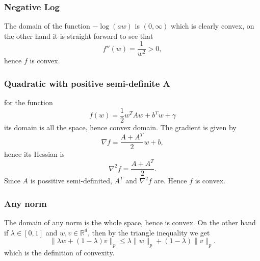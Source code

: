 \documentclass[11pt]{article}
\theoremstyle{plain}
\begin{document}
\subsubsection{Negative Log}
The domain of the function $-\log(aw)$ is $(0,\infty)$ which is clearly convex, on the 
other hand it is straight forward to see that 
\begin{equation*}
f''(w)=\frac{1}{w^{2}}>0,
\end{equation*}
hence $f$ is convex.

\subsubsection{Quadratic with positive semi-definite A}
for the function
\begin{equation*}
f(w)=\frac{1}{2}w^{T}Aw+b^{T}w+\gamma
\end{equation*}
its domain is all the space, hence convex domain. The gradient is given by
\begin{equation*}
\nabla f= \frac{A+A^{T}}{2}w+b,
\end{equation*}
hence its Hessian is
\begin{equation*}
\nabla^{2} f=\frac{A+A^{T}}{2}.
\end{equation*}
Since $A$ is possitive semi-definited, $A^{T}$ and $\nabla^{2} f$ are. Hence $f$ is convex.

\subsubsection{Any norm}
The domain of any norm is the whole space, hence is convex. On the other hand if $\lambda\in[0,1]$ and
$w,v\in\mathbb{R}^{d}$, then by the triangle inequality we get
\begin{equation*}
\|\lambda w+(1-\lambda)v\|_{p}\leq \lambda\|w\|_{p}+(1-\lambda)\|v\|_{p}.
\end{equation*}
which is the definition of convexity.
\end{document}
